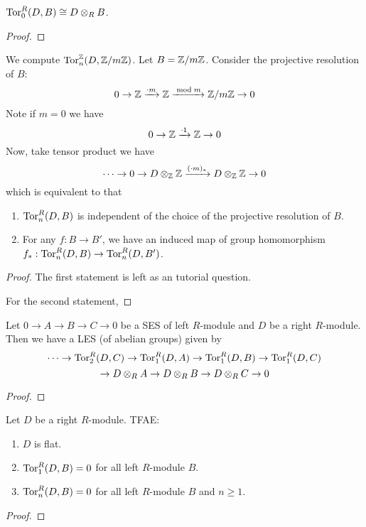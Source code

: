 \medskip

\begin{pro}
    $\operatorname{Tor}_0^R(D,B)\cong D\otimes_R B$.
\end{pro}
\begin{proof}
\end{proof}

\begin{ex}
    We compute $\operatorname{Tor}_n^{\mathbb Z}(D,{\mathbb Z}/m{\mathbb Z})$. Let $B= {\mathbb Z}/m{\mathbb Z}$. Consider the projective resolution of $B$:
    \[0 \to {\mathbb Z} \xrightarrow{\cdot m} {\mathbb Z} \xrightarrow{\bmod m} {\mathbb Z}/m{\mathbb Z}\to 0\]
    Note if $m=0$ we have 
    \[0 \to {\mathbb Z} \xrightarrow{\cdot 1} {\mathbb Z} \to 0\]
    Now, take tensor product we have 
    \[\dots \to 0 \to D\otimes_{\mathbb Z} {\mathbb Z} \xrightarrow{(\cdot m)_*} D\otimes_{\mathbb Z} {\mathbb Z} \to 0\]
    which is equivalent to that 
\end{ex}

\medskip

\begin{pro}
    \hfill

    \begin{enumerate}
        \item $\operatorname{Tor}_n^R(D,B)$ is independent of the choice of the projective resolution of $B$.
        \item For any $f:B\to B'$, we have an induced map of group homomorphism $f_*:\operatorname{Tor}_n^R(D,B) \to \operatorname{Tor}_n^R(D,B')$.
    \end{enumerate}
\end{pro}

\begin{proof}
    The first statement is left as an tutorial question.

    For the second statement, 
\end{proof}

\begin{thm}
    Let $0\to A\to B\to C \to 0$ be a SES of left $R$-module and $D$ be a right $R$-module. Then we have a LES (of abelian groups) given by 
    \[\dots \to \operatorname{Tor}_2^R(D,C)\to \operatorname{Tor}_1^R(D,A) \to \operatorname{Tor}_1^R(D,B)\to \operatorname{Tor}_1^R(D,C)\]
    \[\to D\otimes_R A \to D\otimes_R B\to D\otimes_R C\to 0\]
\end{thm}
\begin{proof}
\end{proof}

\begin{pro} 
    Let $D$ be a right $R$-module. TFAE:
    \begin{enumerate}
        \item $D$ is flat.
        \item $\operatorname{Tor}_1^R(D,B)=0$ for all left $R$-module $B$.
        \item $\operatorname{Tor}_n^R(D,B)=0$ for all left $R$-module $B$ and $n\geq 1$.
    \end{enumerate}
\end{pro}
\begin{proof}
\end{proof}

